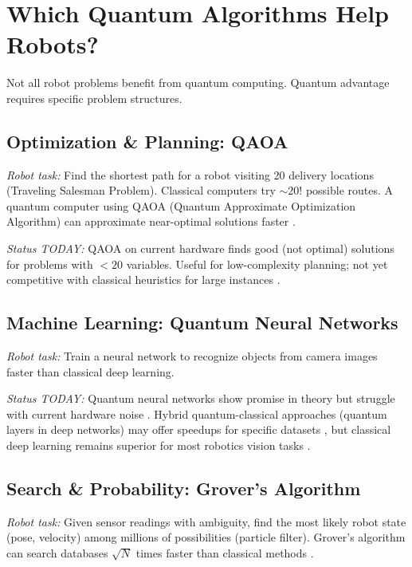 \documentclass[conference]{IEEEtran}
\begin{document}
\section{Which Quantum Algorithms Help Robots?}

Not all robot problems benefit from quantum computing. Quantum advantage requires specific problem structures.

\subsection{Optimization \& Planning: QAOA}

\textit{Robot task:} Find the shortest path for a robot visiting 20 delivery locations (Traveling Salesman Problem). Classical computers try $\sim20!$ possible routes. A quantum computer using QAOA (Quantum Approximate Optimization Algorithm) can approximate near-optimal solutions faster \cite{b15, b16}.

\textit{Status TODAY:} QAOA on current hardware finds good (not optimal) solutions for problems with $<20$ variables. Useful for low-complexity planning; not yet competitive with classical heuristics for large instances \cite{b17, b18, b2}.

\subsection{Machine Learning: Quantum Neural Networks}

\textit{Robot task:} Train a neural network to recognize objects from camera images faster than classical deep learning.

\textit{Status TODAY:} Quantum neural networks show promise in theory but struggle with current hardware noise \cite{b19, b20, b21}. Hybrid quantum-classical approaches (quantum layers in deep networks) may offer speedups for specific datasets \cite{b22, b23, b24}, but classical deep learning remains superior for most robotics vision tasks \cite{b25, b26, b27}.

\subsection{Search \& Probability: Grover's Algorithm}

\textit{Robot task:} Given sensor readings with ambiguity, find the most likely robot state (pose, velocity) among millions of possibilities (particle filter). Grover's algorithm can search databases $\sqrt{N}$ times faster than classical methods \cite{b28, b29}.
\end{document}
